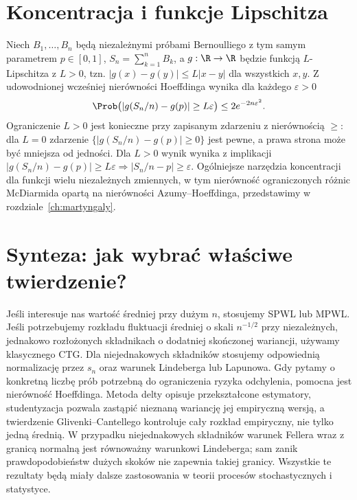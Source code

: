 \section{Koncentracja i funkcje Lipschitza}

\begin{przyklad}
Niech $B_1,\ldots,B_n$ będą niezależnymi próbami Bernoulliego
z tym samym parametrem $p\in[0,1]$,
$S_n=\sum_{k=1}^n B_k$, a $g:\R\to\R$ będzie
funkcją $L$-Lipschitza z $L>0$, tzn.
$|g(x)-g(y)|\leq L|x-y|$ dla wszystkich $x,y$.
Z udowodnionej wcześniej nierówności Hoeffdinga
wynika dla każdego $\varepsilon>0$
\[
\Prob\bigl(|g(S_n/n)-g(p)|\geq L\varepsilon\bigr)
\leq 2e^{-2n\varepsilon^2}.
\]
Ograniczenie $L>0$ jest konieczne przy zapisanym
zdarzeniu z nierównością $\geq$: dla $L=0$
zdarzenie $\{|g(S_n/n)-g(p)|\geq0\}$ jest pewne,
a prawa strona może być mniejsza od jedności.
Dla $L>0$ wynik wynika z implikacji
$|g(S_n/n)-g(p)|\geq L\varepsilon\Longrightarrow
|S_n/n-p|\geq\varepsilon$.
Ogólniejsze narzędzia koncentracji dla funkcji wielu
niezależnych zmiennych, w tym nierówność ograniczonych
różnic McDiarmida opartą na nierówności
Azumy--Hoeffdinga, przedstawimy w rozdziale~\ref{ch:martyngaly}.
\end{przyklad}

\section{Synteza: jak wybrać właściwe twierdzenie?}

Jeśli interesuje nas wartość średniej przy dużym $n$,
stosujemy SPWL lub MPWL. Jeśli potrzebujemy rozkładu
fluktuacji średniej o skali $n^{-1/2}$ przy niezależnych,
jednakowo rozłożonych składnikach o dodatniej
skończonej wariancji, używamy klasycznego CTG.
Dla niejednakowych składników stosujemy odpowiednią
normalizację przez $s_n$ oraz warunek Lindeberga lub
Lapunowa. Gdy pytamy o konkretną liczbę prób potrzebną
do ograniczenia ryzyka odchylenia, pomocna jest
nierówność Hoeffdinga. Metoda delty opisuje
przekształcone estymatory, studentyzacja pozwala
zastąpić nieznaną wariancję jej empiryczną wersją,
a twierdzenie Glivenki--Cantellego kontroluje
cały rozkład empiryczny, nie tylko jedną średnią.
W przypadku niejednakowych składników warunek Fellera
wraz z granicą normalną jest równoważny warunkowi
Lindeberga; sam zanik prawdopodobieństw dużych skoków
nie zapewnia takiej granicy.
Wszystkie te rezultaty będą miały dalsze zastosowania
w teorii procesów stochastycznych i statystyce.

